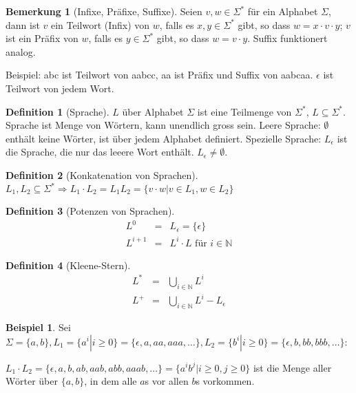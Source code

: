 \documentclass[11pt]{article} %
\theoremstyle{definition}
\newtheorem*{beispiel}{Beispiel}
\newtheorem{definition}{Definition}
\newtheorem*{bemerkung}{Bemerkung}
\begin{document}
\begin{bemerkung}[Infixe, Präfixe, Suffixe]
Seien $v,w \in \Sigma^*$ für ein Alphabet $\Sigma$, dann ist $v$ ein Teilwort (Infix) von $w$, falls es $x,y \in \Sigma^*$ gibt, so dass $w = x\cdot v \cdot y$; $v$ ist ein Präfix von $w$, falls es $y \in \Sigma^*$ gibt, so dass $w = v\cdot y$. Suffix funktionert analog.

Beispiel: abc ist Teilwort von aabcc, aa ist Präfix und Suffix von aabcaa. $\epsilon$ ist Teilwort von jedem Wort.
\end{bemerkung}

\begin{definition}[Sprache]
$L$ über Alphabet $\Sigma$ ist eine Teilmenge von $\Sigma^*$, $L \subseteq \Sigma^*$. Sprache ist Menge von Wörtern, kann unendlich gross sein. Leere Sprache: $\emptyset$ enthält keine Wörter, ist über jedem Alphabet definiert. Spezielle Sprache: $L_\epsilon$ ist die Sprache, die nur das leeere Wort enthält. $L_\epsilon \neq \emptyset$.
\end{definition}

\begin{definition}[Konkatenation von Sprachen] 
$L_1, L_2 \subseteq \Sigma^* \Rightarrow L_1 \cdot L_2 = L_1L_2 = \{ v\cdot w | v\in L_1, w\in L_2 \}$
\end{definition}
\begin{definition}[Potenzen von Sprachen]
\begin{eqnarray*}
L^0 &=& L_\epsilon = \{\epsilon\} \\
L^{i+1} &=& L^i\cdot L \textrm{ für } i \in \mathbb{N}
\end{eqnarray*}
\end{definition}

\begin{definition}[Kleene-Stern] 
\begin{eqnarray*}
L^* &=& \bigcup\limits_{i\in \mathbb{N}}^{} L^i \\
L^+ &=& \bigcup\limits_{i\in \mathbb{N}}^{} L^i - L_\epsilon
\end{eqnarray*}
\end{definition}

\begin{beispiel}
Sei $\Sigma = \{a,b\}, L_1 = \{a^i | i \ge 0\} = \{\epsilon, a, aa, aaa, \dots\}, L_2 = \{b^i | i \ge 0\} = \{\epsilon, b, bb, bbb, \dots\}$:

$L_1\cdot L_2 = \{ \epsilon, a,b,ab,aab,abb,aaab,\dots \} = \{a^ib^j | i \ge 0, j \ge 0 \}$ ist die Menge aller Wörter über $\{a,b\}$, in dem alle $a$s vor allen $b$s vorkommen.
\end{beispiel}
\end{document}
